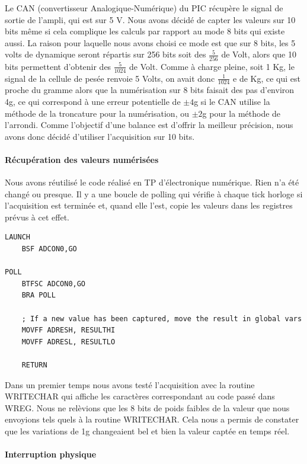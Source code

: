 \documentclass[a4paper,11pt,titlepage]{article}
\begin{document}
Le CAN (convertisseur Analogique-Numérique) du PIC récupère le signal de sortie de l'ampli, qui est sur 5 V. Nous avons décidé de capter les valeurs sur 10 bits même si cela complique les calculs par rapport au mode 8 bits qui existe aussi. La raison pour laquelle nous avons choisi ce mode est que sur 8 bits, les 5 volts de dynamique seront répartis sur 256 bits soit des $\frac{5}{256}$ de Volt, alors que 10 bits permettent d'obtenir des $\frac{5}{1024}$ de Volt. Comme à charge pleine, soit 1 Kg, le signal de la cellule de pesée renvoie 5 Volts, on avait donc $\frac{1}{1024}$ e de Kg, ce qui est proche du gramme alors que la numérisation sur 8 bits faisait des pas d'environ 4g, ce qui correspond à une erreur potentielle de $\pm 4$g si le CAN utilise la méthode de la troncature pour la numérisation, ou $\pm 2$g pour la méthode de l'arrondi. Comme l'objectif d'une balance est d'offrir la meilleur précision, nous avons donc décidé d'utiliser l'acquisition sur 10 bits.

\paragraph{Récupération des valeurs numérisées}

Nous avons réutilisé le code réalisé en TP d'électronique numérique. Rien n'a été changé ou presque. 
Il y a une boucle de polling qui vérifie à chaque tick horloge si l'acquisition est terminée et, quand elle l'est, copie les valeurs dans les registres prévus à cet effet.\\

\begin{lstlisting}
LAUNCH
    BSF ADCON0,GO
    
POLL
    BTFSC ADCON0,GO
    BRA POLL
    
    ; If a new value has been captured, move the result in global vars
    MOVFF ADRESH, RESULTHI
    MOVFF ADRESL, RESULTLO
    
    RETURN 
\end{lstlisting}

Dans un premier temps nous avons testé l'acquisition avec la routine WRITECHAR qui affiche les caractères correspondant au code passé dans WREG. Nous ne relèvions que les 8 bits de poids faibles de la valeur que nous envoyions tels quels à la routine WRITECHAR. Cela nous a permis de constater que les variations de 1g changeaient bel et bien la valeur captée en temps réel.

\paragraph{Interruption physique}
\end{document}
